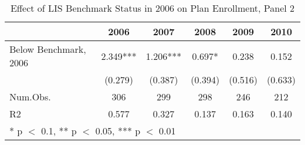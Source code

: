 \begin{table}
\centering
\begin{tabular}[t]{lccccc}
\toprule
  & 2006 & 2007 & 2008 & 2009 & 2010\\
\midrule
Below Benchmark, 2006 & \num{2.349}*** & \num{1.206}*** & \num{0.697}* & \num{0.238} & \num{0.152}\\
 & (\num{0.279}) & (\num{0.387}) & (\num{0.394}) & (\num{0.516}) & (\num{0.633})\\
\midrule
Num.Obs. & \num{306} & \num{299} & \num{298} & \num{246} & \num{212}\\
R2 & \num{0.577} & \num{0.327} & \num{0.137} & \num{0.163} & \num{0.140}\\
\bottomrule
\multicolumn{6}{l}{\rule{0pt}{1em}* p $<$ 0.1, ** p $<$ 0.05, *** p $<$ 0.01}\\
\end{tabular}
\caption{Effect of LIS Benchmark Status in 2006 on Plan Enrollment, Panel 2}
\label{tab:panel2}
\end{table}
